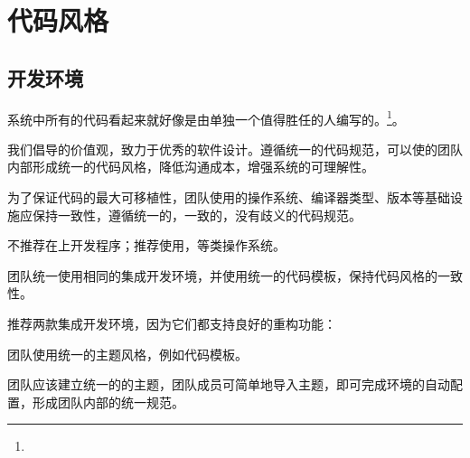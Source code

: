\begin{savequote}[45mm]
\end{savequote}

\chapter{代码风格} 
\label{ch:physical-design}

\section{开发环境}

\begin{content}

\begin{regulation}
系统中所有的代码看起来就好像是由单独一个值得胜任的人编写的。\footnote{}。
\end{regulation}

我们倡导的价值观，致力于优秀的软件设计。遵循统一的代码规范，可以使的团队内部形成统一的代码风格，降低沟通成本，增强系统的可理解性。

\begin{regulation}
为了保证代码的最大可移植性，团队使用的操作系统、编译器类型、版本等基础设施应保持一致性，遵循统一的，一致的，没有歧义的代码规范。
\end{regulation}

不推荐在上开发程序；推荐使用，等类操作系统。

\begin{regulation}
团队统一使用相同的集成开发环境，并使用统一的代码模板，保持代码风格的一致性。
\end{regulation}

推荐两款集成开发环境，因为它们都支持良好的重构功能：
\begin{enum}
\end{enum}

\begin{regulation}
团队使用统一的主题风格，例如代码模板。
\end{regulation}

团队应该建立统一的的主题，团队成员可简单地导入主题，即可完成环境的自动配置，形成团队内部的统一规范。


\end{content}
